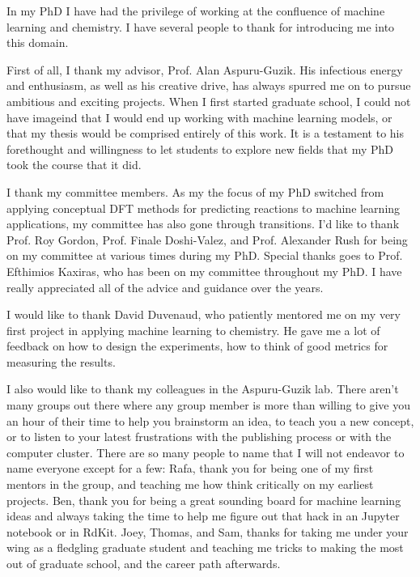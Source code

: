 In my PhD I have had the privilege of working at the confluence of machine learning and chemistry. I have several people to thank for introducing me into this domain.

First of all, I thank my advisor, Prof. Alan Aspuru-Guzik. His infectious energy and enthusiasm, as well as his creative drive, has always spurred me on to pursue ambitious and exciting projects. When I first started graduate school, I could not have imageind that I would end up working with machine learning models, or that my thesis would be comprised entirely of this work. It is a testament to his forethought and willingness to let students to explore new fields that my PhD took the course that it did. 

I thank my committee members. As my the focus of my PhD switched from applying conceptual DFT methods for predicting reactions to machine learning applications, my committee has also gone through transitions. I'd like to thank Prof. Roy Gordon, Prof. Finale Doshi-Valez, and Prof. Alexander Rush for being on my committee at various times during my PhD. Special thanks goes to Prof. Efthimios Kaxiras, who has been on my committee throughout my PhD. I have really appreciated all of the advice and guidance over the years.

I would like to thank David Duvenaud, who patiently mentored me on my very first project in applying machine learning to chemistry. He gave me a lot of feedback on how to design the experiments, how to think of good metrics for measuring the results. 

I also would like to thank my colleagues in the Aspuru-Guzik lab.  There aren't many groups out there where any group member is more than willing to give you an hour of their time to help you brainstorm an idea, to teach you a new concept, or to listen to your latest frustrations with the publishing process or with the computer cluster. There are so many people to name that I will not endeavor to name everyone except for a few: Rafa, thank you for being one of my first mentors in the group, and teaching me how think critically on my earliest projects. Ben, thank you for being a great sounding board for machine learning ideas and always taking the time to help me figure out that hack in an Jupyter notebook or in RdKit. Joey, Thomas, and Sam, thanks for taking me under your wing as a fledgling graduate student and teaching me tricks to making the most out of graduate school, and the career path afterwards. 

